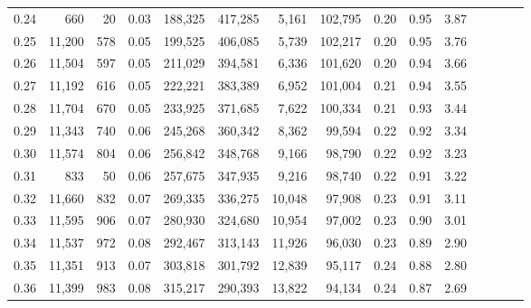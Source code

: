 \begin{tabular}{rrrcrrrrrrrrrrr}
0.24 &     660 &     20 &                                       0.03 &  188,325 &  417,285 &    5,161 &  102,795 &  0.20 &  0.95 &                         3.87 \\
0.25 &  11,200 &    578 &                                       0.05 &  199,525 &  406,085 &    5,739 &  102,217 &  0.20 &  0.95 &                         3.76 \\
0.26 &  11,504 &    597 &                                       0.05 &  211,029 &  394,581 &    6,336 &  101,620 &  0.20 &  0.94 &                         3.66 \\
0.27 &  11,192 &    616 &                                       0.05 &  222,221 &  383,389 &    6,952 &  101,004 &  0.21 &  0.94 &                         3.55 \\
0.28 &  11,704 &    670 &                                       0.05 &  233,925 &  371,685 &    7,622 &  100,334 &  0.21 &  0.93 &                         3.44 \\
0.29 &  11,343 &    740 &                                       0.06 &  245,268 &  360,342 &    8,362 &   99,594 &  0.22 &  0.92 &                         3.34 \\
0.30 &  11,574 &    804 &                                       0.06 &  256,842 &  348,768 &    9,166 &   98,790 &  0.22 &  0.92 &                         3.23 \\
0.31 &     833 &     50 &                                       0.06 &  257,675 &  347,935 &    9,216 &   98,740 &  0.22 &  0.91 &                         3.22 \\
0.32 &  11,660 &    832 &                                       0.07 &  269,335 &  336,275 &   10,048 &   97,908 &  0.23 &  0.91 &                         3.11 \\
0.33 &  11,595 &    906 &                                       0.07 &  280,930 &  324,680 &   10,954 &   97,002 &  0.23 &  0.90 &                         3.01 \\
0.34 &  11,537 &    972 &                                       0.08 &  292,467 &  313,143 &   11,926 &   96,030 &  0.23 &  0.89 &                         2.90 \\
0.35 &  11,351 &    913 &                                       0.07 &  303,818 &  301,792 &   12,839 &   95,117 &  0.24 &  0.88 &                         2.80 \\
0.36 &  11,399 &    983 &                                       0.08 &  315,217 &  290,393 &   13,822 &   94,134 &  0.24 &  0.87 &                         2.69 \\

\end{tabular}

